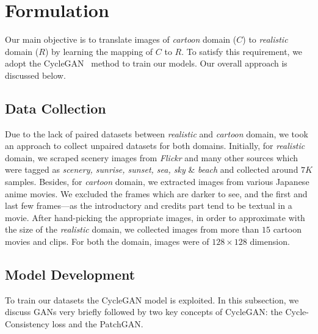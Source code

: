 \documentclass[10pt,twocolumn,letterpaper]{article}
\begin{document}
\section{Formulation}
Our main objective is to translate images of \textit{cartoon} domain ($C$) to \textit{realistic} domain ($R$) by learning the mapping of $C$ to $R$. 
To satisfy this requirement, we adopt the {CycleGAN}~\cite{CycleGAN2017} method to train our models. Our overall approach is discussed below.

\subsection{Data Collection}
Due to the lack of paired datasets between \textit{realistic} and \textit{cartoon} domain, we took an approach to collect unpaired datasets for both domains. Initially, for \textit{realistic} domain, we scraped scenery images from \textit{Flickr} and many other sources which were tagged as \textit{scenery, sunrise, sunset, sea, sky} \& \textit{beach} and collected around $7K$ samples.
Besides, for \textit{cartoon} domain, we extracted images from various Japanese anime movies. We excluded the frames which are darker to see, and the first and last few frames---as the introductory and credits part tend to be textual in a movie.
After hand-picking the appropriate images, in order to approximate with the size of the \textit{realistic} domain, we collected images from more than $15$ cartoon movies and clips. For both the domain, images were of $128\times 128$ dimension.

\subsection{Model Development}

To train our datasets the CycleGAN model is exploited. In this subsection, we discuss GANs very briefly followed by two key concepts of CycleGAN: the {Cycle-Consistency loss} and the PatchGAN.
\end{document}
